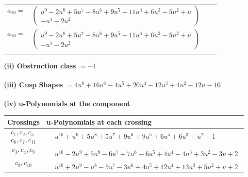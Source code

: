 \documentclass[1p]{elsarticle_modified}
\theoremstyle{definition}
\begin{document}
\begin{tabular}{m{7pt} m{180pt} m{7pt} m{180pt} }
\flushright $a_{10}=$&$\begin{pmatrix}u^9-2 u^8+5 u^7-8 u^6+9 u^5-11 u^4+6 u^3-5 u^2+u\\- u^4-2 u^2\end{pmatrix}$\\ \flushright $a_{10}=$&$\begin{pmatrix}u^9-2 u^8+5 u^7-8 u^6+9 u^5-11 u^4+6 u^3-5 u^2+u\\- u^4-2 u^2\end{pmatrix}$\\&\end{tabular}
\flushleft \textbf{(ii) Obstruction class $= -1$}\\~\\
\flushleft \textbf{(iii) Cusp Shapes $= 4 u^8+16 u^6-4 u^5+20 u^4-12 u^3+4 u^2-12 u-10$}\\~\\
\newpage\renewcommand{\arraystretch}{1}
\flushleft \textbf{(iv) u-Polynomials at the component}\newline \\
\begin{tabular}{m{50pt}|m{274pt}}
Crossings & \hspace{64pt}u-Polynomials at each crossing \\
\hline $$\begin{aligned}c_{1},c_{2},c_{5}\\c_{6},c_{7},c_{11}\end{aligned}$$&$\begin{aligned}
&u^{10}+u^9+5 u^8+5 u^7+9 u^6+9 u^5+6 u^4+6 u^3+u^2+1
\end{aligned}$\\
\hline $$\begin{aligned}c_{3},c_{4},c_{9}\end{aligned}$$&$\begin{aligned}
&u^{10}-2 u^9+5 u^8-6 u^7+7 u^6-6 u^5+4 u^4-4 u^3+3 u^2-3 u+2
\end{aligned}$\\
\hline $$\begin{aligned}c_{8},c_{10}\end{aligned}$$&$\begin{aligned}
&u^{10}+2 u^9- u^8-5 u^7-3 u^6+4 u^5+12 u^4+13 u^3+5 u^2+u+2
\end{aligned}$\\
\hline
\end{tabular}\\~\\
\newpage\renewcommand{\arraystretch}{1}
\end{document}
